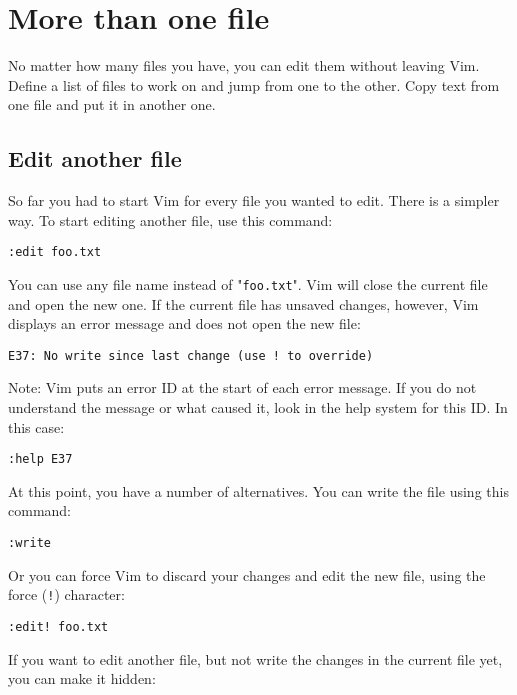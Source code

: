 \section{More than one file}
No matter how many files you have, you can edit them without leaving Vim.
Define a list of files to work on and jump from one to the other.
Copy text from one file and put it in another one.
\subsection{Edit another file}

So far you had to start Vim for every file you wanted to edit.
There is a simpler way.
To start editing another file, use this command:

 \begin{Verbatim}[samepage=true]
 :edit foo.txt
 \end{Verbatim}

You can use any file name instead of "\verb!foo.txt!".
Vim will close the current file and open the new one.
If the current file has unsaved changes, however, Vim displays an error message and does not open the new file:

\begin{Verbatim}[samepage=true]
  E37: No write since last change (use ! to override) 
\end{Verbatim}

Note:
Vim puts an error ID at the start of each error message.
If you do not understand the message or what caused it, look in the help system for this ID.
In this case:

\begin{Verbatim}[samepage=true]
  :help E37
\end{Verbatim}

At this point, you have a number of alternatives.
You can write the file using this command:

 \begin{Verbatim}[samepage=true]
 :write
 \end{Verbatim}

Or you can force Vim to discard your changes and edit the new file, using the force (\verb:!:) character:

 \begin{Verbatim}[samepage=true]
 :edit! foo.txt
 \end{Verbatim}

If you want to edit another file, but not write the changes in the current file yet, you can make it hidden:

